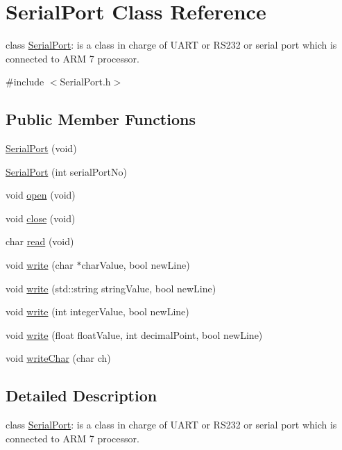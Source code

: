 \hypertarget{class_serial_port}{
\section{SerialPort Class Reference}
\label{d1/df4/class_serial_port}
}


class \hyperlink{class_serial_port}{SerialPort}: is a class in charge of UART or RS232 or serial port which is connected to ARM 7 processor.  




{\ttfamily \#include $<$SerialPort.h$>$}

\subsection*{Public Member Functions}
\begin{DoxyCompactItemize}
\item 
\hyperlink{class_serial_port_ada293366f077e225baa5290634c60d88}{SerialPort} (void)
\item 
\hyperlink{group__group8_gaa95a052574086564644915c26aa42159}{SerialPort} (int serialPortNo)
\item 
void \hyperlink{group__group8_ga6d80380bb3415a1ee4355ffcec98773c}{open} (void)
\item 
void \hyperlink{group__group8_gaabba6d6f25800b197cee28ed8e605f2a}{close} (void)
\item 
char \hyperlink{group__group8_gaa38a0c0f839a8bf27786ac86d8ca525b}{read} (void)
\item 
void \hyperlink{group__group8_gae48d12719fd7e1e2b0e35f127a5006bf}{write} (char $\ast$charValue, bool newLine)
\item 
void \hyperlink{group__group8_ga93f70c8ee96c97eee2d31df578bdf51e}{write} (std::string stringValue, bool newLine)
\item 
void \hyperlink{group__group8_gad981db5bddd0681367480c272c87fb38}{write} (int integerValue, bool newLine)
\item 
void \hyperlink{group__group8_gab50edcebab73bfe52b729f677dd61636}{write} (float floatValue, int decimalPoint, bool newLine)
\item 
void \hyperlink{group__group8_gaa3dd171551bd6b38d949768f5cb335f2}{writeChar} (char ch)
\end{DoxyCompactItemize}


\subsection{Detailed Description}
class \hyperlink{class_serial_port}{SerialPort}: is a class in charge of UART or RS232 or serial port which is connected to ARM 7 processor. 

